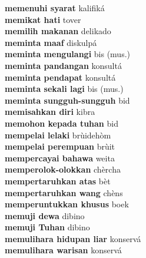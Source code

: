 \textbf{ memenuhi syarat  } kalifiká \\
\textbf{ memikat hati  } tover \\
\textbf{ memilih makanan  } delikado \\
\textbf{ meminta maaf  } diskulpá \\
\textbf{ meminta mengulangi  } bis (mus.) \\
\textbf{ meminta pandangan  } konsultá \\
\textbf{ meminta pendapat  } konsultá \\
\textbf{ meminta sekali lagi  } bis (mus.) \\
\textbf{ meminta sungguh-sungguh  } bid \\
\textbf{ memisahkan diri  } kibra \\
\textbf{ memohon kepada tuhan  } bid \\
\textbf{ mempelai lelaki  } brùidehòm \\
\textbf{ mempelai perempuan  } brùit \\
\textbf{ mempercayai bahawa  } weita \\
\textbf{ memperolok-olokkan  } chèrcha \\
\textbf{ mempertaruhkan atas  } bèt \\
\textbf{ mempertaruhkan wang  } chèns \\
\textbf{ memperuntukkan khusus  } boek \\
\textbf{ memuji dewa  } dibino \\
\textbf{ memuji Tuhan  } dibino \\
\textbf{ memulihara hidupan liar  } konservá \\
\textbf{ memulihara warisan  } konservá \\
